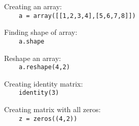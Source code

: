 Creating an array:\\
{\ex \lstinline|    a = array([[1,2,3,4],[5,6,7,8]])|}

Finding shape of array:\\
{\ex \lstinline|    a.shape|}

Reshape an array:\\
{\ex \lstinline|    a.reshape(4,2)|}

Creating identity matrix:\\
{\ex \lstinline|    identity(3)|}

Creating matrix with all zeros:\\
{\ex \lstinline|    z = zeros((4,2))|}
